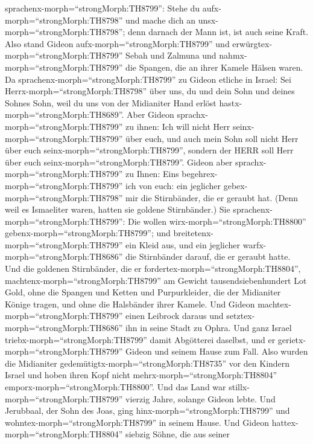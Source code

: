 sprachenx-morph=``strongMorph:TH8799'': Stehe du
aufx-morph=``strongMorph:TH8798'' und mache dich an
unsx-morph=``strongMorph:TH8798''; denn darnach der Mann ist, ist auch
seine Kraft. Also stand Gideon aufx-morph=``strongMorph:TH8799'' und
erwürgtex-morph=``strongMorph:TH8799'' Sebah und Zalmuna und
nahmx-morph=``strongMorph:TH8799'' die Spangen, die an ihrer Kamele
Hälsen waren.  Da sprachenx-morph=``strongMorph:TH8799'' zu
Gideon etliche in Israel: Sei Herrx-morph=``strongMorph:TH8798'' über
uns, du und dein Sohn und deines Sohnes Sohn, weil du uns von der
Midianiter Hand erlöst hastx-morph=``strongMorph:TH8689''. 
Aber Gideon sprachx-morph=``strongMorph:TH8799'' zu ihnen: Ich will
nicht Herr seinx-morph=``strongMorph:TH8799'' über euch, und auch mein
Sohn soll nicht Herr über euch seinx-morph=``strongMorph:TH8799'',
sondern der HERR soll Herr über euch seinx-morph=``strongMorph:TH8799''.
 Gideon aber sprachx-morph=``strongMorph:TH8799'' zu Ihnen:
Eins begehrex-morph=``strongMorph:TH8799'' ich von euch: ein jeglicher
gebex-morph=``strongMorph:TH8798'' mir die Stirnbänder, die er geraubt
hat. (Denn weil es Ismaeliter waren, hatten sie goldene Stirnbänder.)
 Sie sprachenx-morph=``strongMorph:TH8799'': Die wollen
wirx-morph=``strongMorph:TH8800'' gebenx-morph=``strongMorph:TH8799'';
und breitetenx-morph=``strongMorph:TH8799'' ein Kleid aus, und ein
jeglicher warfx-morph=``strongMorph:TH8686'' die Stirnbänder darauf, die
er geraubt hatte.  Und die goldenen Stirnbänder, die er
fordertex-morph=``strongMorph:TH8804'',
machtenx-morph=``strongMorph:TH8799'' am Gewicht tausendsiebenhundert
Lot Gold, ohne die Spangen und Ketten und Purpurkleider, die der
Midianiter Könige tragen, und ohne die Halsbänder ihrer Kamele.
 Und Gideon machtex-morph=``strongMorph:TH8799'' einen
Leibrock daraus und setztex-morph=``strongMorph:TH8686'' ihn in seine
Stadt zu Ophra. Und ganz Israel triebx-morph=``strongMorph:TH8799''
damit Abgötterei daselbst, und er gerietx-morph=``strongMorph:TH8799''
Gideon und seinem Hause zum Fall.  Also wurden die
Midianiter gedemütigtx-morph=``strongMorph:TH8735'' vor den Kindern
Israel und hoben ihren Kopf nicht mehrx-morph=``strongMorph:TH8804''
emporx-morph=``strongMorph:TH8800''. Und das Land war
stillx-morph=``strongMorph:TH8799'' vierzig Jahre, solange Gideon lebte.
 Und Jerubbaal, der Sohn des Joas, ging
hinx-morph=``strongMorph:TH8799'' und
wohntex-morph=``strongMorph:TH8799'' in seinem Hause.  Und
Gideon hattex-morph=``strongMorph:TH8804'' siebzig Söhne, die aus seiner
